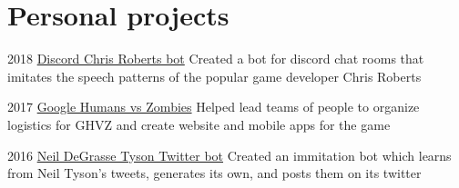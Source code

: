 \documentclass[oldfontcommands]{tccv}
\begin{document}
\section{Personal projects}

\begin{yearlist}

\item{2018}
     {\href{https://github.com/apophis981/chris_roberts_bot}{Discord Chris Roberts bot}}
     {Created a bot for discord chat rooms that imitates the speech patterns of the popular game developer Chris Roberts}

\item{2017}
     {\href{https://github.com/apophis981/ghvz}{Google Humans vs Zombies}}
     {Helped lead teams of people to organize logistics for GHVZ and create website and mobile apps for the game}

\item{2016}
     {\href{https://twitter.com/neiltyson_bot}{Neil DeGrasse Tyson Twitter bot}}
     {Created an immitation bot which learns from Neil Tyson's tweets, generates its own, and posts them on its twitter}

%
\end{yearlist}
\end{document}
